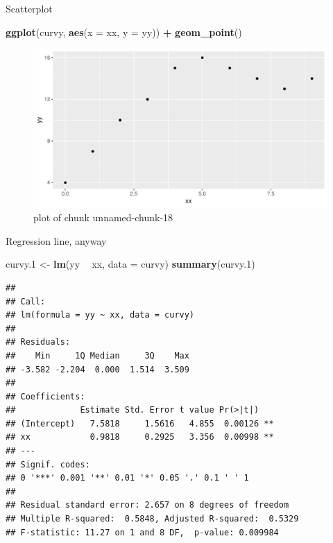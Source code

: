 \documentclass[ignorenonframetext,]{beamer}
\newenvironment{Shaded}{\begin{snugshade}}{\end{snugshade}}
\newcommand{\DataTypeTok}[1]{\textcolor[rgb]{0.13,0.29,0.53}{#1}}
\newcommand{\FloatTok}[1]{\textcolor[rgb]{0.00,0.00,0.81}{#1}}
\newcommand{\KeywordTok}[1]{\textcolor[rgb]{0.13,0.29,0.53}{\textbf{#1}}}
\newcommand{\NormalTok}[1]{#1}
\newcommand{\OperatorTok}[1]{\textcolor[rgb]{0.81,0.36,0.00}{\textbf{#1}}}
\newcommand{\StringTok}[1]{\textcolor[rgb]{0.31,0.60,0.02}{#1}}
\begin{document}
\begin{frame}[fragile]{Scatterplot}
\protect\hypertarget{scatterplot}{}

\begin{Shaded}
\begin{Highlighting}[]
\KeywordTok{ggplot}\NormalTok{(curvy, }\KeywordTok{aes}\NormalTok{(}\DataTypeTok{x =}\NormalTok{ xx, }\DataTypeTok{y =}\NormalTok{ yy)) }\OperatorTok{+}\StringTok{ }\KeywordTok{geom_point}\NormalTok{()}
\end{Highlighting}
\end{Shaded}

\begin{figure}
\centering
\includegraphics{figure/unnamed-chunk-18-1.pdf}
\caption{plot of chunk unnamed-chunk-18}
\end{figure}

\end{frame}

\begin{frame}[fragile]{Regression line, anyway}
\protect\hypertarget{regression-line-anyway}{}

\scriptsize

\begin{Shaded}
\begin{Highlighting}[]
\NormalTok{curvy}\FloatTok{.1}\NormalTok{ <-}\StringTok{ }\KeywordTok{lm}\NormalTok{(yy }\OperatorTok{~}\StringTok{ }\NormalTok{xx, }\DataTypeTok{data =}\NormalTok{ curvy)}
\KeywordTok{summary}\NormalTok{(curvy}\FloatTok{.1}\NormalTok{)}
\end{Highlighting}
\end{Shaded}

\begin{verbatim}
## 
## Call:
## lm(formula = yy ~ xx, data = curvy)
## 
## Residuals:
##    Min     1Q Median     3Q    Max 
## -3.582 -2.204  0.000  1.514  3.509 
## 
## Coefficients:
##             Estimate Std. Error t value Pr(>|t|)   
## (Intercept)   7.5818     1.5616   4.855  0.00126 **
## xx            0.9818     0.2925   3.356  0.00998 **
## ---
## Signif. codes:  
## 0 '***' 0.001 '**' 0.01 '*' 0.05 '.' 0.1 ' ' 1
## 
## Residual standard error: 2.657 on 8 degrees of freedom
## Multiple R-squared:  0.5848, Adjusted R-squared:  0.5329 
## F-statistic: 11.27 on 1 and 8 DF,  p-value: 0.009984
\end{verbatim}

\normalsize

\end{frame}
\end{document}
